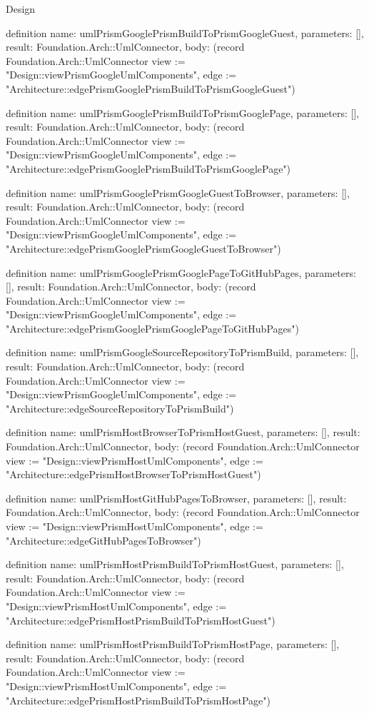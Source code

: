 \begin{lexlean}{Design}
\begin{semanticmodule}
definition{
  name: umlPrismGooglePrismBuildToPrismGoogleGuest,
  parameters: [],
  result: Foundation.Arch::UmlConnector,
  body: (record Foundation.Arch::UmlConnector {view := "Design::viewPrismGoogleUmlComponents", edge := "Architecture::edgePrismGooglePrismBuildToPrismGoogleGuest"})
}

definition{
  name: umlPrismGooglePrismBuildToPrismGooglePage,
  parameters: [],
  result: Foundation.Arch::UmlConnector,
  body: (record Foundation.Arch::UmlConnector {view := "Design::viewPrismGoogleUmlComponents", edge := "Architecture::edgePrismGooglePrismBuildToPrismGooglePage"})
}

definition{
  name: umlPrismGooglePrismGoogleGuestToBrowser,
  parameters: [],
  result: Foundation.Arch::UmlConnector,
  body: (record Foundation.Arch::UmlConnector {view := "Design::viewPrismGoogleUmlComponents", edge := "Architecture::edgePrismGooglePrismGoogleGuestToBrowser"})
}

definition{
  name: umlPrismGooglePrismGooglePageToGitHubPages,
  parameters: [],
  result: Foundation.Arch::UmlConnector,
  body: (record Foundation.Arch::UmlConnector {view := "Design::viewPrismGoogleUmlComponents", edge := "Architecture::edgePrismGooglePrismGooglePageToGitHubPages"})
}

definition{
  name: umlPrismGoogleSourceRepositoryToPrismBuild,
  parameters: [],
  result: Foundation.Arch::UmlConnector,
  body: (record Foundation.Arch::UmlConnector {view := "Design::viewPrismGoogleUmlComponents", edge := "Architecture::edgeSourceRepositoryToPrismBuild"})
}

definition{
  name: umlPrismHostBrowserToPrismHostGuest,
  parameters: [],
  result: Foundation.Arch::UmlConnector,
  body: (record Foundation.Arch::UmlConnector {view := "Design::viewPrismHostUmlComponents", edge := "Architecture::edgePrismHostBrowserToPrismHostGuest"})
}

definition{
  name: umlPrismHostGitHubPagesToBrowser,
  parameters: [],
  result: Foundation.Arch::UmlConnector,
  body: (record Foundation.Arch::UmlConnector {view := "Design::viewPrismHostUmlComponents", edge := "Architecture::edgeGitHubPagesToBrowser"})
}

definition{
  name: umlPrismHostPrismBuildToPrismHostGuest,
  parameters: [],
  result: Foundation.Arch::UmlConnector,
  body: (record Foundation.Arch::UmlConnector {view := "Design::viewPrismHostUmlComponents", edge := "Architecture::edgePrismHostPrismBuildToPrismHostGuest"})
}

definition{
  name: umlPrismHostPrismBuildToPrismHostPage,
  parameters: [],
  result: Foundation.Arch::UmlConnector,
  body: (record Foundation.Arch::UmlConnector {view := "Design::viewPrismHostUmlComponents", edge := "Architecture::edgePrismHostPrismBuildToPrismHostPage"})
}


\end{semanticmodule}
\end{lexlean}
